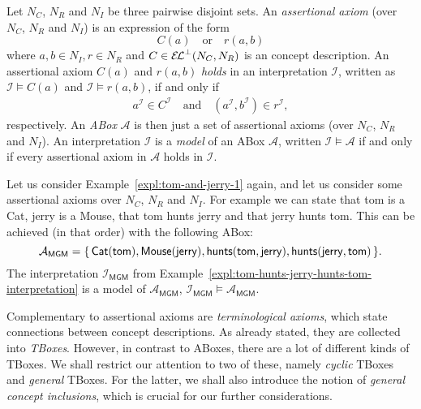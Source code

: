 \begin{Definition}
  \label{def:assertional-axiom-and-ABox}
  Let $N_C$, $N_R$ and $N_I$ be three pairwise disjoint sets.  An \emph{assertional axiom}
  (over $N_C$, $N_R$ and $N_I$) is an expression of the form
  \begin{equation*}
    C(a) \quad\text{or}\quad r(a, b)
  \end{equation*}
  where $a, b \in N_I, r \in N_R$ and $C \in {\ensuremath{{\mathcal{E}\kern-.3ex\mathcal{L}}^\bot}}(N_C, N_R)$ is an \ELbot concept
  description.  An assertional axiom $C(a)$ and $r(a,b)$ \emph{holds} in an interpretation
  $\mathcal{I}$, written as $\mathcal{I} \models C(a)$ and $\mathcal{I} \models r(a, b)$,
  if and only if
  \begin{align*}
    a^{\mathcal{I}} \in C^{\mathcal{I}} \quad\text{and}\quad (a^{\mathcal{I}},
    b^{\mathcal{I}}) \in r^{\mathcal{I}},
  \end{align*}
  respectively.  An \emph{ABox} $\mathcal{A}$ is then just a set of assertional axioms
  (over $N_C$, $N_R$ and $N_I$).  An interpretation $\mathcal{I}$ is a \emph{model} of an
  ABox $\mathcal{A}$, written $\mathcal{I} \models \mathcal{A}$ if and only if every
  assertional axiom in $\mathcal{A}$ holds in $\mathcal{I}$.
\end{Definition}

\begin{Example}
  \label{expl:tom-and-jerry-ABox}
  Let us consider Example~\ref{expl:tom-and-jerry-1} again, and let us consider some
  assertional axioms over $N_C$, $N_R$ and $N_I$.  For example we can state that
  \textsf{tom} is a \textsf{Cat}, \textsf{jerry} is a \textsf{Mouse}, that \textsf{tom}
  \textsf{hunts} \textsf{jerry} and that \textsf{jerry} \textsf{hunts} \textsf{tom}.  This
  can be achieved (in that order) with the following ABox:
  \begin{equation*}
    \mathcal{A}_{\mathsf{MGM}} = {\{\, \mathsf{Cat}(\mathsf{tom}), \mathsf{Mouse}(\mathsf{jerry}),
      \mathsf{hunts}(\mathsf{tom}, \mathsf{jerry}),
      \mathsf{hunts}(\mathsf{jerry}, \mathsf{tom}) \,\}}.
  \end{equation*}
  The interpretation $\mathcal{I}_{\mathsf{MGM}}$ from
  Example~\ref{expl:tom-hunts-jerry-hunts-tom-interpretation} is a model of
  $\mathcal{A}_{\mathsf{MGM}}$, \ie $\mathcal{I}_{\mathsf{MGM}} \models
  \mathcal{A}_{\mathsf{MGM}}$.
\end{Example}

Complementary to assertional axioms are \emph{terminological axioms}, which state
connections between concept descriptions.  As already stated, they are collected into
\emph{TBoxes}.  However, in contrast to ABoxes, there are a lot of different kinds of
TBoxes.  We shall restrict our attention to two of these, namely \emph{cyclic} TBoxes and
\emph{general} TBoxes.  For the latter, we shall also introduce the notion of
\emph{general concept inclusions}, which is crucial for our further considerations.


